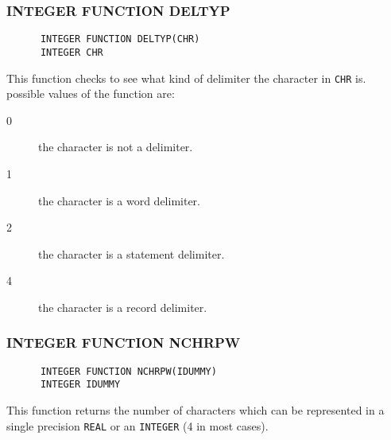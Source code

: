 \subsubsection{\sf INTEGER FUNCTION DELTYP}
\begin{verbatim}
      INTEGER FUNCTION DELTYP(CHR)
      INTEGER CHR
\end{verbatim}
This function checks to see what kind of delimiter the character in {\tt CHR}
is. possible values of the function are:
\begin{description}
\item[0] the character is not a delimiter.
\item[1] the character is a word delimiter.
\item[2] the character is a statement delimiter.
\item[4] the character is a record delimiter.
\end{description}
\subsubsection{\sf INTEGER FUNCTION NCHRPW}
\begin{verbatim}
      INTEGER FUNCTION NCHRPW(IDUMMY)
      INTEGER IDUMMY
\end{verbatim}
This function returns the number of characters which can be represented
in a single precision {\tt REAL} or an {\tt INTEGER} (4 in most cases).


